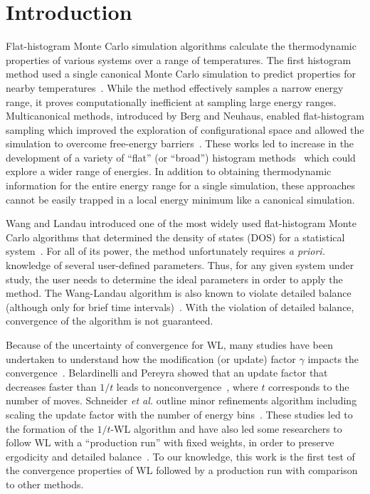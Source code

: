 \section{Introduction}
Flat-histogram Monte Carlo simulation algorithms calculate the thermodynamic
properties of various systems over a range of temperatures.  The first histogram
method used a single canonical Monte Carlo simulation to predict properties for
nearby temperatures~\cite{ferrenberg1988new}. While the method effectively
samples a narrow energy range, it proves computationally inefficient at sampling large energy ranges.
Multicanonical methods, introduced by Berg and Neuhaus, enabled flat-histogram
sampling which improved the exploration of configurational space and allowed the
simulation to overcome free-energy barriers~\cite{berg1991multicanonical, berg1992multicanonical}.
These works led to increase in the development of a variety of ``flat'' (or ``broad'') histogram
methods~\cite{penna1996broad, penna1998broad, swendsen1999transition,
wang2001determining, wang2001efficient} which could explore a wider range
of energies.  In addition to obtaining thermodynamic information for the entire
energy range for a single simulation, these approaches cannot be easily trapped
in a local energy minimum like a canonical simulation.


Wang and Landau introduced one of the most widely used flat-histogram
Monte Carlo algorithms that determined the density of states (DOS) for
a statistical system~\cite{wang2001determining,wang2001efficient}. For all of
its power, the method unfortunately requires \emph{a priori.} knowledge of several
user-defined parameters. Thus, for any given system under study, the user needs
to determine the ideal parameters in order to apply the method. The Wang-Landau
algorithm is also known to violate detailed balance (although only for brief
time intervals)~\cite{yan2003fast, shell2002generalization}. With the violation
of detailed balance, convergence of the algorithm is not guaranteed.

Because of the uncertainty of convergence for WL, many studies have been undertaken
to understand how the modification (or update) factor $\gamma$ impacts the
convergence~\cite{zhou2005understanding,lee2006convergence,
belardinelli2007wang}. Belardinelli and Pereyra showed that an update factor that decreases faster than $1/t$ leads to nonconvergence~\cite{belardinelli2007wang, belardinelli2008analysis, zhou2008optimal}, where $t$ corresponds to the number of moves. Schneider \emph{et al.} outline minor refinements algorithm including scaling the update factor with the number of energy bins~\cite{schneider2017convergence}.
These studies led to the
formation of the $1/t$-WL algorithm and have also led some researchers to follow
WL with a ``production run'' with fixed weights, in order to preserve ergodicity and
detailed balance~\cite{jayasri2005wang, mukhopadhyay2008monte}.
%
To our knowledge, this work is the first test of the convergence
properties of WL followed by a production run with comparison to other
methods.

